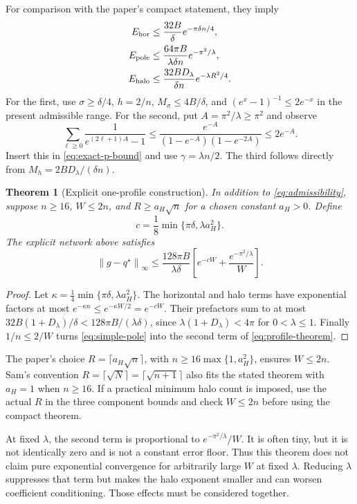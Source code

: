 \documentclass[11pt]{article}
\newcommand{\norm}[1]{\left\lVert#1\right\rVert}
\newtheorem{theorem}{Theorem}
\begin{document}
For comparison with the paper's compact statement, they imply
\begin{align}
 E_{\rm hor}&\le\frac{32B}{\delta}e^{-\pi\delta n/4},
 \label{eq:simple-horizontal}\\
 E_{\rm pole}&\le\frac{64\pi B}{\lambda\delta n}e^{-\pi^2/\lambda},
 \label{eq:simple-pole}\\
 E_{\rm halo}&\le\frac{32BD_\lambda}{\delta n}e^{-\lambda R^2/4}.
 \label{eq:simple-halo}
\end{align}
For the first, use $\sigma\ge\delta/4$, $h=2/n$, $M_\sigma\le4B/\delta$, and $(e^x-1)^{-1}\le2e^{-x}$ in the present admissible range. For the second, put $A=\pi^2/\lambda\ge\pi^2$ and observe
\[
 \sum_{\ell\ge0}\frac1{e^{(2\ell+1)A}-1}
 \le\frac{e^{-A}}{(1-e^{-A})(1-e^{-2A})}\le2e^{-A}.
\]
Insert this in \eqref{eq:exact-p-bound} and use $\gamma=\lambda n/2$. The third follows directly from $M_h=2BD_\lambda/(\delta n)$.

\begin{theorem}[Explicit one-profile construction]
In addition to \eqref{eq:admissibility}, suppose $n\ge16$, $W\le2n$, and
$R\ge a_H\sqrt n$ for a chosen constant $a_H>0$. Define
\[
 c=\frac18\min\{\pi\delta,\lambda a_H^2\}.
\]
The explicit network above satisfies
\begin{equation}
 \norm{g-q^\star}_\infty\le
 \frac{128\pi B}{\lambda\delta}
 \left[e^{-cW}+\frac{e^{-\pi^2/\lambda}}W\right].
 \label{eq:profile-theorem}
\end{equation}
\end{theorem}
\begin{proof}
Let $\kappa=\frac14\min\{\pi\delta,\lambda a_H^2\}$. The horizontal and halo terms have exponential factors at most $e^{-\kappa n}\le e^{-\kappa W/2}=e^{-cW}$. Their prefactors sum to at most
$32B(1+D_\lambda)/\delta<128\pi B/(\lambda\delta)$, since
$\lambda(1+D_\lambda)<4\pi$ for $0<\lambda\le1$. Finally $1/n\le2/W$ turns \eqref{eq:simple-pole} into the second term of \eqref{eq:profile-theorem}.
\end{proof}

The paper's choice $R=\lceil a_H\sqrt n\rceil$, with $n\ge16\max\{1,a_H^2\}$, ensures $W\le2n$. Sam's convention $R=\lceil\sqrt N\rceil=\lceil\sqrt{n+1}\rceil$ also fits the stated theorem with $a_H=1$ when $n\ge16$. If a practical minimum halo count is imposed, use the actual $R$ in the three component bounds and check $W\le2n$ before using the compact theorem.

At fixed $\lambda$, the second term is proportional to $e^{-\pi^2/\lambda}/W$. It is often tiny, but it is not identically zero and is not a constant error floor. Thus this theorem does not claim pure exponential convergence for arbitrarily large $W$ at fixed $\lambda$. Reducing $\lambda$ suppresses that term but makes the halo exponent smaller and can worsen coefficient conditioning. Those effects must be considered together.
\end{document}
